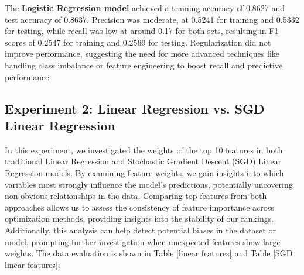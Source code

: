 \documentclass{article}
\begin{document}
The \textbf{Logistic Regression model} achieved a training accuracy of 0.8627 and test accuracy of 0.8637. Precision was moderate, at 0.5241 for training and 0.5332 for testing, while recall was low at around 0.17 for both sets, resulting in F1-scores of 0.2547 for training and 0.2569 for testing. Regularization did not improve performance, suggesting the need for more advanced techniques like handling class imbalance or feature engineering to boost recall and predictive performance.

\subsection{Experiment 2: Linear Regression vs. SGD Linear Regression}

In this experiment, we investigated the weights of the top 10 features in both traditional Linear Regression and Stochastic Gradient Descent (SGD) Linear Regression models. By examining feature weights, we gain insights into which variables most strongly influence the model's predictions, potentially uncovering non-obvious relationships in the data. Comparing top features from both approaches allows us to assess the consistency of feature importance across optimization methods, providing insights into the stability of our rankings. Additionally, this analysis can help detect potential biases in the dataset or model, prompting further investigation when unexpected features show large weights. The data evaluation is shown in Table \ref{linear features} and Table \ref{SGD linear features}:
\end{document}
